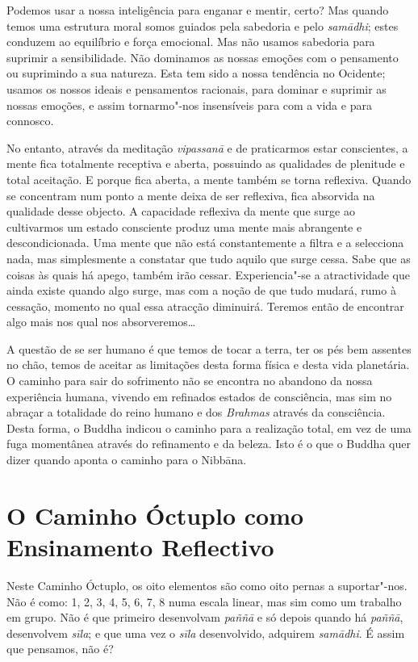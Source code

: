 Podemos usar a nossa inteligência para enganar e mentir, certo? Mas quando temos
uma estrutura moral somos guiados pela sabedoria e pelo \emph{samādhi}; estes
conduzem ao equilíbrio e força emocional. Mas não usamos sabedoria para suprimir
a sensibilidade. Não dominamos as nossas emoções com o pensamento ou suprimindo
a sua natureza. Esta tem sido a nossa tendência no Ocidente; usamos os nossos
ideais e pensamentos racionais, para dominar e suprimir as nossas emoções, e
assim tornarmo"-nos insensíveis para com a vida e para connosco.

No entanto, através da meditação \emph{vipassanā} e de praticarmos estar conscientes,
a mente fica totalmente receptiva e aberta, possuindo as qualidades de plenitude
e total aceitação. E porque fica aberta, a mente também se torna reflexiva.
Quando se concentram num ponto a mente deixa de ser reflexiva, fica absorvida
na qualidade desse objecto. A capacidade reflexiva da mente que surge ao cultivarmos
um estado consciente produz uma mente mais abrangente e descondicionada. 
Uma mente que não está constantemente a filtra e a selecciona nada, mas simplesmente a 
constatar que tudo aquilo que  surge cessa. Sabe que as coisas às quais há apego, também 
irão cessar. Experiencia"-se a atractividade que ainda existe quando algo surge, mas com 
a noção de que tudo mudará, rumo à cessação, momento no qual essa atracção diminuirá. 
Teremos então de encontrar algo mais nos qual nos absorveremos\ldots{}

A questão de se ser humano é que temos de tocar a terra, ter os pés bem assentes
no chão, temos de aceitar as limitações desta forma física e desta vida
planetária. O caminho para sair do sofrimento não se encontra no abandono da
nossa experiência humana, vivendo em refinados estados de consciência, mas sim no
abraçar a totalidade do reino humano e dos \emph{Brahmas} através da consciência. Desta forma, o Buddha indicou o caminho para a realização total, em vez
de uma fuga momentânea através do refinamento e da beleza. Isto é o que o Buddha
quer dizer quando aponta o caminho para o Nibbāna.

\section{O Caminho Óctuplo como Ensinamento Reflectivo}

Neste Caminho Óctuplo, os oito elementos são como oito pernas a suportar"-nos.
Não é como: 1, 2, 3, 4, 5, 6, 7, 8 numa escala linear, mas sim como um trabalho
em grupo. Não é que primeiro desenvolvam \emph{paññā} e só depois quando há
\emph{paññā}, desenvolvem \emph{sīla}; e que uma vez o \emph{sīla}
desenvolvido, adquirem \emph{samādhi}. É assim que pensamos, não é?

